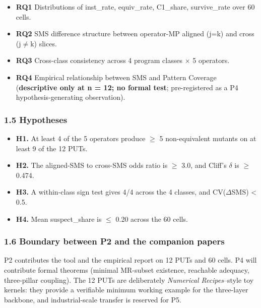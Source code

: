\documentclass[review,12pt,authoryear]{elsarticle}
\providecommand{\tightlist}{\setlength{\itemsep}{0pt}\setlength{\parskip}{0pt}}
\begin{document}
\begin{itemize}
\tightlist
\item
  \textbf{RQ1} Distributions of inst\_rate, equiv\_rate, C1\_share,
  survive\_rate over 60 cells.
\item
  \textbf{RQ2} SMS difference structure between operator-MP aligned
  (j=k) and cross (j$\neq$k) slices.
\item
  \textbf{RQ3} Cross-class consistency across 4 program classes $\times$ 5
  operators.
\item
  \textbf{RQ4} Empirical relationship between SMS and Pattern Coverage
  (\textbf{descriptive only at n = 12; no formal test}; pre-registered
  as a P4 hypothesis-generating observation).
\end{itemize}

\subsubsection{1.5 Hypotheses}\label{hypotheses}

\begin{itemize}
\tightlist
\item
  \textbf{H1.} At least 4 of the 5 operators produce $\geq$ 5 non-equivalent
  mutants on at least 9 of the 12 PUTs.
\item
  \textbf{H2.} The aligned-SMS to cross-SMS odds ratio is $\geq$ 3.0, and
  Cliff's $\delta$ is $\geq$ 0.474.
\item
  \textbf{H3.} A within-class sign test gives 4/4 across the 4 classes,
  and CV($\Delta$SMS) \textless{} 0.5.
\item
  \textbf{H4.} Mean suspect\_share is $\leq$ 0.20 across the 60 cells.
\end{itemize}

\subsubsection{1.6 Boundary between P2 and the companion papers}\label{boundary-between-p2-and-the-companion-papers}

P2 contributes the tool and the empirical report on 12 PUTs and 60
cells. P4 will contribute formal theorems (minimal MR-subset existence,
reachable adequacy, three-pillar coupling). The 12 PUTs are deliberately
\emph{Numerical Recipes}--style toy kernels: they provide a verifiable
minimum working example for the three-layer backbone, and
industrial-scale transfer is reserved for P5.

\end{document}
